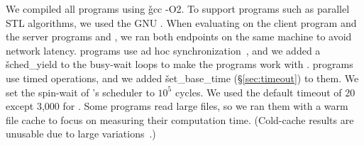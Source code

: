 We compiled all programs using \v{gcc -O2}.  To support
\openmp programs such as parallel STL algorithms, we used the GNU \libgomp.
When evaluating \parrot on the client program \aget and the server programs \openldap
and \redis, we ran both endpoints on the same machine to avoid network
latency.  \nprogadhocsync programs use ad hoc
synchronization~\cite{syncfinder:osdi10}, and we added a \v{sched\_yield}
to the busy-wait loops to make the programs work with \parrot.  \nprogtimeout
programs use \pthread timed operations, and we added \v{set\_base\_time}
(\S\ref{sec:timeout}) to them. We set the spin-wait of \parrot's scheduler
to $10^5$ cycles.  We used the default \compute timeout of 20 except 3,000
for \ferret.  Some \phoenix programs read large files, so
we ran them with a warm file cache to focus on measuring their computation
time. (Cold-cache results are unusable due to large
variations~\cite{Parrot:github}.)


